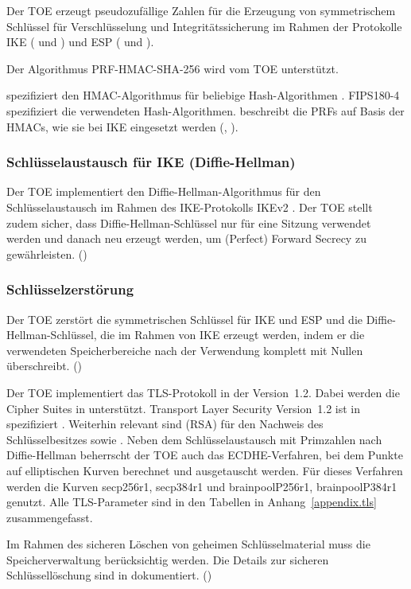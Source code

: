 Der TOE erzeugt pseudozufällige Zahlen für die Erzeugung von symmetrischem
Schlüssel für Verschlüsselung und Integritätssicherung im Rahmen der Protokolle
IKE ( und ) und ESP ( und
).

Der Algorithmus PRF-HMAC-SHA-256 wird vom TOE unterstützt.

 spezifiziert den HMAC-Algorithmus für beliebige Hash-Algorithmen
\cite{rfc2104}.  FIPS180-4 \cite{FIPS180-4} spezifiziert die verwendeten
Hash-Algorithmen. \cite{rfc4868} beschreibt die PRFs auf Basis der HMACs, wie
sie bei IKE eingesetzt werden (, ).


\subsubsection{Schlüsselaustausch für IKE (Diffie-Hellman)}%
\label{sf.cryptographicservices.ipsec.keyexc}

Der TOE implementiert den Diffie-Hellman-Algorithmus für den Schlüsselaustausch
im Rahmen des IKE-Protokolls IKEv2 \cite{rfc7296}.  Der TOE stellt zudem sicher,
dass Diffie-Hellman-Schlüssel nur für eine Sitzung verwendet werden und danach
neu erzeugt werden, um (Perfect) Forward Secrecy zu
gewährleisten. ()

\subsubsection{Schlüsselzerstörung}%
\label{sf.cryptographicservices.ipsec.keydest}

Der TOE zerstört die symmetrischen Schlüssel für IKE und ESP und die
Diffie-Hellman-Schlüssel, die im Rahmen von IKE erzeugt werden, indem er die
verwendeten Speicherbereiche nach der Verwendung komplett mit Nullen
überschreibt. ()


Der TOE implementiert das TLS-Protokoll in der Version~1.2. Dabei werden die
Cipher Suites in  unterstützt.  Transport Layer
Security Version~1.2 ist in  spezifiziert \cite{rfc5246}. Weiterhin
relevant sind  (RSA) für den Nachweis des Schlüsselbesitzes
\cite{rfc8017} sowie . Neben dem Schlüsselaustausch mit Primzahlen
nach Diffie-Hellman beherrscht der TOE auch das ECDHE-Verfahren, bei dem Punkte
auf elliptischen Kurven berechnet und ausgetauscht werden. Für dieses Verfahren
werden die Kurven secp256r1, secp384r1 \cite{rfc8422, X9.62} und
brainpoolP256r1, brainpoolP384r1 \cite{rfc7027} genutzt. Alle TLS-Parameter sind
in den Tabellen in Anhang~\ref{appendix.tls} zusammengefasst.

Im Rahmen des sicheren Löschen von geheimen Schlüsselmaterial muss die
Speicherverwaltung berücksichtig werden. Die Details zur sicheren
Schlüssellöschung sind in \autocite{adv_tds} dokumentiert.
()



